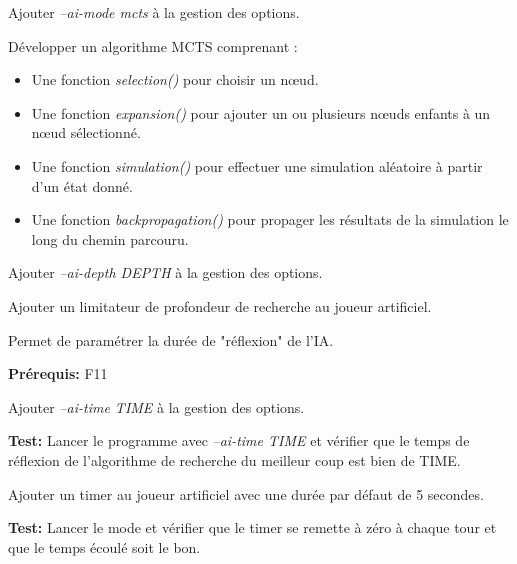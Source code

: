 \documentclass{article}
\begin{document}
\begin{needbox}
    \begin{subneedbox}
        Ajouter \textit{--ai-mode mcts} à la gestion des options.
    \end{subneedbox}

    \begin{subneedbox}
        Développer un algorithme MCTS comprenant :
        \begin{itemize}
            \item Une fonction \textit{selection()} pour choisir un nœud.
            \item Une fonction \textit{expansion()} pour ajouter un ou plusieurs nœuds enfants à un nœud sélectionné.
            \item Une fonction \textit{simulation()} pour effectuer une simulation aléatoire à partir d'un état donné.
            \item Une fonction \textit{backpropagation()} pour propager les résultats de la simulation le long du chemin parcouru.
        \end{itemize}
    \end{subneedbox}
\end{needbox}

\begin{needbox}
    \begin{subneedbox}
        Ajouter \textit{--ai-depth DEPTH} à la gestion des options.
    \end{subneedbox}
    \begin{subneedbox}
        Ajouter un limitateur de profondeur de recherche au joueur artificiel.
    \end{subneedbox}
\end{needbox}


\begin{needbox}
    Permet de paramétrer la durée de "réflexion" de l'IA.

    \textbf{Prérequis:} F11
    \begin{subneedbox}
        Ajouter \textit{--ai-time TIME} à la gestion des options.

        \textbf{Test:} Lancer le programme avec \textit{--ai-time TIME} et vérifier que
        le temps de réflexion de l'algorithme de recherche du meilleur coup est bien de TIME.
    \end{subneedbox}
    \begin{subneedbox}
        Ajouter un timer au joueur artificiel avec une durée par défaut de 5 secondes.

        \textbf{Test:} Lancer le mode et vérifier que le timer se remette à zéro à chaque tour et que le temps écoulé soit le bon.
    \end{subneedbox}
\end{needbox}
\end{document}
